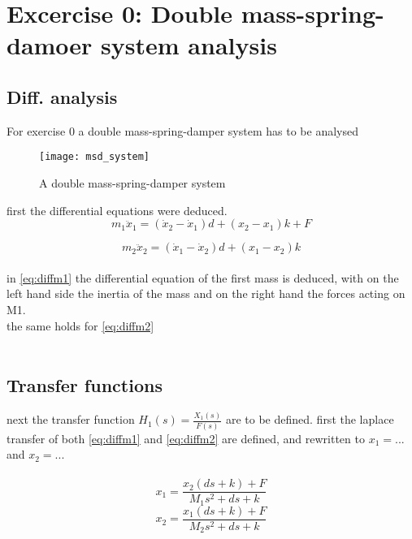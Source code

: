 \chapter{Excercise 0: Double mass-spring-damoer system analysis}
\section{Diff. analysis}

For exercise 0 a double mass-spring-damper system has to be analysed

\begin{figure}[H]
	\texttt{[image: msd\_system]}
	\centering
	\caption{A double mass-spring-damper system}
	\label{fig:intro_system}
\end{figure}
first the differential equations were deduced.\\

\begin{equation}
\label{eq:diffm1}
{ m }_{ 1 }{ \ddot { x }  }_{ 1 }=({ \dot { x }  }_{ 2 }-\dot { x } _{ 1 })d+({ x }_{ 2 }-{ x }_{ 1 })k+F
\end{equation}

\begin{equation}
\label{eq:diffm2}
{ m }_{ 2 }{ \ddot { x }  }_{ 2 }=({ \dot { x }  }_{ 1 }-\dot { x } _{ 2 })d+({ x }_{ 1 }-{ x }_{ 2 })k
\end{equation}
\\

in \eqref{eq:diffm1} the differential equation of the first mass is deduced, with on the left hand side the inertia of the mass and on the right hand the forces acting on M1.\\
the same holds for \eqref{eq:diffm2}\\
 \\
 \section{Transfer functions}
next the transfer function ${ H }_{ 1 }(s)=\frac { { X }_{ 1 }(s) }{ F(s) } $ are to be defined. first the laplace transfer of both \eqref{eq:diffm1} and \eqref{eq:diffm2} are defined, and rewritten to $x_1=...$ and $x_2=...$\\
 \\
 
\begin{equation}
\label{eq:lap_x1}
x_1=\frac{x_2(ds+k)+F}{M_1s^2+ds+k}
\end{equation}
\begin{equation}
\label{eq:lap_x2}
x_2=\frac{x_1(ds+k)+F}{M_2s^2+ds+k}
\end{equation}

